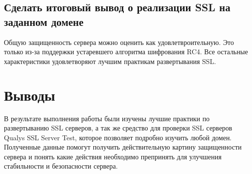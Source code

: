 \documentclass[10pt,a4paper]{article}
\begin{document}
\subsection{Сделать итоговый вывод о реализации SSL на заданном домене}
Общую защищенность сервера можно оценить как удовлетвроительную. Это только из-за поддержки устаревшего алгоритма шифрования RC4. Все остальные характеристики удовлетворяют лучшим практикам развертывания SSL.

\section{Выводы}
В результате выполнения работы были изучены лучшие практики по развертыванию SSL серверов, а так же средство для проверки SSL серверов Qualys SSL Server Test, которое позволяет подробно изучить любой домен. Полученные данные помогут получить действительную картину защищенности сервера и понять какие действия необходимо препринять для улучшения стабильности и безопасности сервера.



\end{document}
